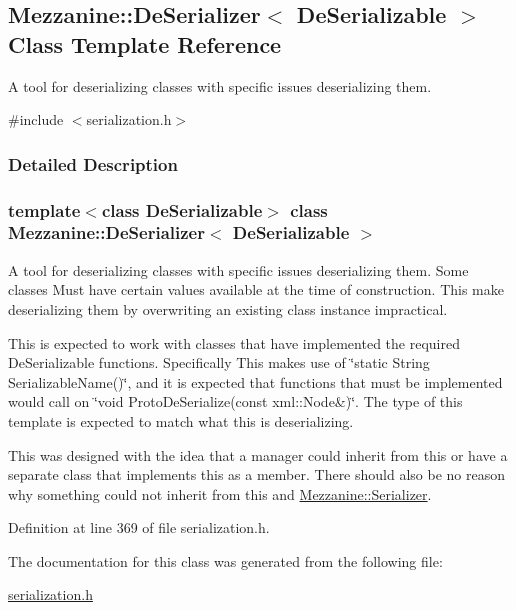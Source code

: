 \hypertarget{classMezzanine_1_1DeSerializer}{
\subsection{Mezzanine::DeSerializer$<$ DeSerializable $>$ Class Template Reference}
\label{classMezzanine_1_1DeSerializer}
}


A tool for deserializing classes with specific issues deserializing them.  




{\ttfamily \#include $<$serialization.h$>$}



\subsubsection{Detailed Description}
\subsubsection*{template$<$class DeSerializable$>$ class Mezzanine::DeSerializer$<$ DeSerializable $>$}

A tool for deserializing classes with specific issues deserializing them. Some classes Must have certain values available at the time of construction. This make deserializing them by overwriting an existing class instance impractical. \par
 \par
 This is expected to work with classes that have implemented the required DeSerializable functions. Specifically This makes use of \char`\"{}static String SerializableName()\char`\"{}, and it is expected that functions that must be implemented would call on \char`\"{}void ProtoDeSerialize(const xml::Node\&)\char`\"{}. The type of this template is expected to match what this is deserializing. \par
 \par
 This was designed with the idea that a manager could inherit from this or have a separate class that implements this as a member. There should also be no reason why something could not inherit from this and \hyperlink{classMezzanine_1_1Serializer}{Mezzanine::Serializer}. 

Definition at line 369 of file serialization.h.



The documentation for this class was generated from the following file:\begin{DoxyCompactItemize}
\item 
\hyperlink{serialization_8h}{serialization.h}\end{DoxyCompactItemize}
